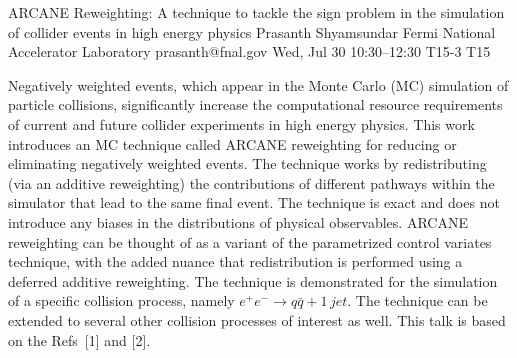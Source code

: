 \begin{talk}
  {ARCANE Reweighting: A technique to tackle the sign problem in the simulation of collider events in high energy physics}%
  {Prasanth Shyamsundar}%
  {Fermi National Accelerator Laboratory}%
  {prasanth@fnal.gov}%
  {}%
  {}%
  {Wed, Jul 30 10:30–12:30}%
  {T15-3}%
  {T15}%
  {}%
  
				
			

Negatively weighted events, which appear in the Monte Carlo (MC) simulation of particle collisions, significantly increase the computational resource requirements of current and future collider experiments in high energy physics. This work introduces an MC technique called ARCANE reweighting for reducing or eliminating negatively weighted events. The technique works by redistributing (via an additive reweighting) the contributions of different pathways within the simulator that lead to the same final event. The technique is exact and does not introduce any biases in the distributions of physical observables. ARCANE reweighting can be thought of as a variant of the parametrized control variates technique, with the added nuance that redistribution is performed using a deferred additive reweighting. The technique is demonstrated for the simulation of a specific collision process, namely $e^+ e^- \longrightarrow q \bar{q} + 1\,jet$. The technique can be extended to several other collision processes of interest as well. This talk is based on the Refs~[1] and [2].

\medskip


\end{talk}

